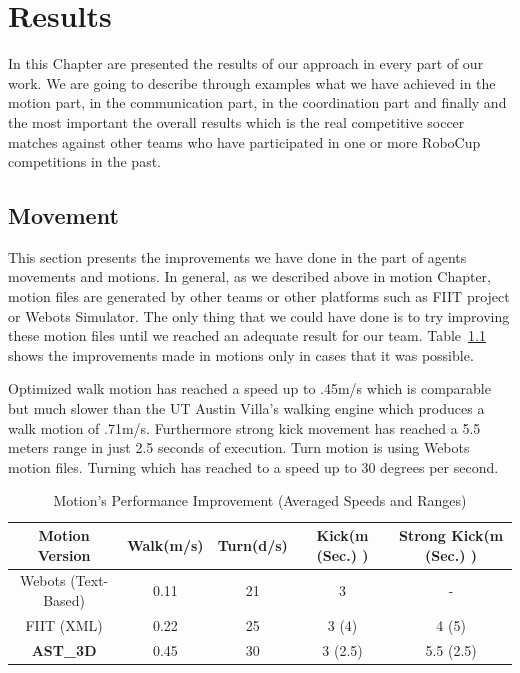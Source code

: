 \chapter{Results}
\label{results}
In this Chapter are presented the results of our approach in every part of our work. We are going to describe through examples what we have achieved in the motion part, in the communication part, in the coordination part and finally and the most important the overall results which is the real competitive soccer matches against other teams who have participated in one or more RoboCup competitions in the past.

\section{Movement}
This section presents the improvements we have done in the part of agents movements and motions. In general, as we described above in motion Chapter, motion files are generated by other teams or other platforms such as FIIT project or Webots Simulator. The only thing that we could have done is to try improving these motion files until we reached an adequate result for our team. Table~\ref{MotionImprovements} shows the improvements made in motions only in cases that it was possible. 

Optimized walk motion has reached a speed up to .45m/s which is comparable but much slower than the UT Austin Villa's walking engine which produces a walk motion of .71m/s. Furthermore strong kick movement has reached a 5.5 meters range in just 2.5 seconds of execution. Turn motion is using Webots motion files. Turning which has reached to a speed up to 30 degrees per second. 

\begin{table}
\begin{center}
\begin{footnotesize}
\begin{tabular}{ccccc}
\textbf{Motion Version} & \textbf{Walk(m/s)}	& \textbf{Turn(d/s)}	& \textbf{Kick(m (Sec.) )}&\textbf{Strong Kick(m (Sec.) )} \\
\midrule
Webots (Text-Based) 		& 0.11 				& 21 				& 3 				& - \\
FIIT (XML)				& 0.22 				& 25 				& 3 (4) 		& 4 (5) \\
\textbf{AST\_3D} 		& 0.45 	& 30 		& 3 (2.5)& 5.5 (2.5) \\
\end{tabular}
\end{footnotesize}
\end{center}
\label{MotionImprovements}
\caption{Motion's Performance Improvement (Averaged Speeds and Ranges)}
\end{table}



